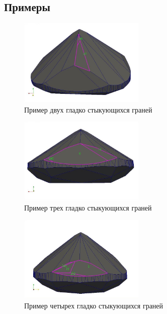 \documentclass[a4paper,12pt, titlepage]{article}
\begin{document}
\subsection{Примеры} 
\begin{flushleft}
  \begin{figure}[thb]
    \includegraphics[clip, width=6cm]{img/poly-join-1.jpeg}
    \caption{Пример двух гладко стыкующихся граней}\label{poly-join-1}
  \end{figure}
\end{flushleft}
\begin{flushleft}
  \begin{figure}[thb]
    \includegraphics[clip, width=6cm]{img/poly-join-2.jpeg}
    \caption{Пример трех гладко стыкующихся граней}\label{poly-join-2}
  \end{figure}
\end{flushleft}
\begin{flushleft}
  \begin{figure}[thb]
    \includegraphics[clip, width=6cm]{img/poly-join-4.jpeg}
    \caption{Пример четырех гладко стыкующихся граней}\label{poly-join-4}
  \end{figure}
\end{flushleft}
\end{document}
